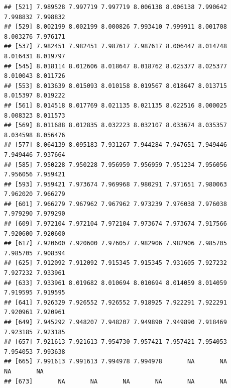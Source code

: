 \documentclass[
]{article}
\newenvironment{Shaded}{\begin{snugshade}}{\end{snugshade}}
\newcommand{\CommentTok}[1]{\textcolor[rgb]{0.56,0.35,0.01}{\textit{#1}}}
\newcommand{\FunctionTok}[1]{\textcolor[rgb]{0.00,0.00,0.00}{#1}}
\newcommand{\NormalTok}[1]{#1}
\newcommand{\OtherTok}[1]{\textcolor[rgb]{0.56,0.35,0.01}{#1}}
\newcommand{\SpecialCharTok}[1]{\textcolor[rgb]{0.00,0.00,0.00}{#1}}
\begin{document}
\begin{verbatim}
## [521] 7.989528 7.997719 7.997719 8.006138 8.006138 7.990642 7.998832 7.998832
## [529] 8.002199 8.002199 8.000826 7.993410 7.999911 8.001708 8.003276 7.976171
## [537] 7.982451 7.982451 7.987617 7.987617 8.006447 8.014748 8.016431 8.019797
## [545] 8.018114 8.012606 8.018647 8.018762 8.025377 8.025377 8.010043 8.011726
## [553] 8.013639 8.015093 8.010158 8.019567 8.018647 8.013715 8.015397 8.019222
## [561] 8.014518 8.017769 8.021135 8.021135 8.022516 8.000025 8.008323 8.011573
## [569] 8.011688 8.012835 8.032223 8.032107 8.033674 8.035357 8.034598 8.056476
## [577] 8.064139 8.095183 7.931267 7.944284 7.947651 7.949446 7.949446 7.937664
## [585] 7.950228 7.950228 7.956959 7.956959 7.951234 7.956056 7.956056 7.959421
## [593] 7.959421 7.973674 7.969968 7.980291 7.971651 7.980063 7.962020 7.966279
## [601] 7.966279 7.967962 7.967962 7.973239 7.976038 7.976038 7.979290 7.979290
## [609] 7.972104 7.972104 7.972104 7.973674 7.973674 7.917566 7.920600 7.920600
## [617] 7.920600 7.920600 7.976057 7.982906 7.982906 7.985705 7.985705 7.908394
## [625] 7.912092 7.912092 7.915345 7.915345 7.931605 7.927232 7.927232 7.933961
## [633] 7.933961 8.019682 8.010694 8.010694 8.014059 8.014059 7.919595 7.919595
## [641] 7.926329 7.926552 7.926552 7.918925 7.922291 7.922291 7.920961 7.920961
## [649] 7.945292 7.948207 7.948207 7.949890 7.949890 7.918469 7.923185 7.923185
## [657] 7.921613 7.921613 7.954730 7.957421 7.957421 7.954053 7.954053 7.993638
## [665] 7.991613 7.991613 7.994978 7.994978       NA       NA       NA       NA
## [673]       NA       NA       NA       NA       NA       NA
\end{verbatim}

\begin{Shaded}
\end{Shaded}
\end{document}
